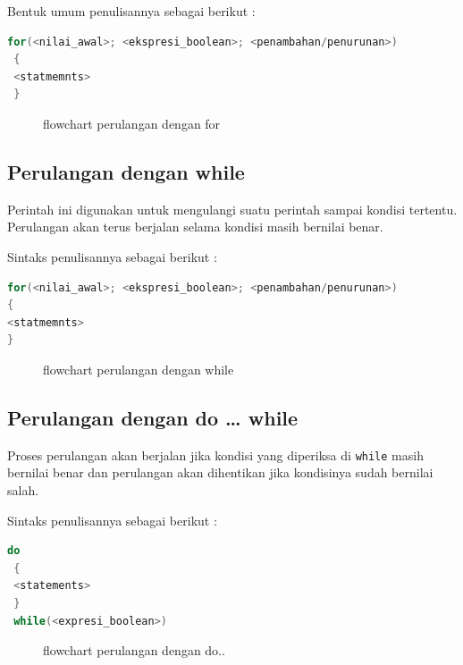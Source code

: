 Bentuk umum penulisannya sebagai berikut :

\begin{lstlisting}[language=c++, numbers=none]
 for(<nilai_awal>; <ekspresi_boolean>; <penambahan/penurunan>)
 {
 <statmemnts>
 }
\end{lstlisting}

\begin{figure}[htbp]
\centering
{}
\caption{flowchart perulangan dengan for}
\end{figure}

\subsection{Perulangan dengan while}\label{perulangan-dengan-while}

Perintah ini digunakan untuk mengulangi suatu perintah sampai kondisi
tertentu. Perulangan akan terus berjalan selama kondisi masih bernilai
benar.

Sintaks penulisannya sebagai berikut :

\begin{lstlisting}[language=c++, numbers=none]
for(<nilai_awal>; <ekspresi_boolean>; <penambahan/penurunan>)
{
<statmemnts>
}
\end{lstlisting}

\begin{figure}[htbp]
\centering
{}
\caption{flowchart perulangan dengan while}
\end{figure}

\subsection{Perulangan dengan do \ldots{} while}\label{perulangan-dengan-do-while}

Proses perulangan akan berjalan jika kondisi yang diperiksa di
\texttt{while} masih bernilai benar dan perulangan akan dihentikan jika
kondisinya sudah bernilai salah.

Sintaks penulisannya sebagai berikut :

\begin{lstlisting}[language=c++, numbers=none]
 do
 {
 <statements>
 }
 while(<expresi_boolean>)
\end{lstlisting}

\begin{figure}[htbp]
\centering
{}
\caption{flowchart perulangan dengan do..}
\end{figure}

